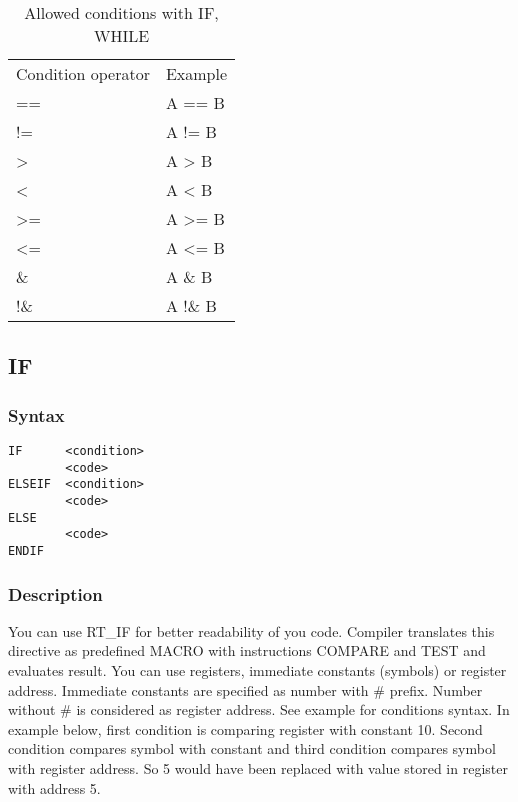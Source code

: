     \begin{table}[h!]
        \mysmallfont{}
        \centering{}
        \begin{tabular}{|l|l}
            \hline
            Condition operator       &          Example  \\
            ==                       &          A ==  B  \\
            !=                       &          A !=  B  \\
            >                        &          A >   B  \\
            <                        &          A <   B  \\
            >=                       &          A >=  B  \\
            <=                       &          A <=  B  \\
            \&                       &          A \&  B  \\
            !\&                      &          A !\& B
        \end{tabular}
        \caption{Allowed conditions with IF, WHILE}
    \end{table}

    \subsection{IF}
        \subsubsection{Syntax}
            \verb'IF      <condition>'\\
            \verb'        <code>'\\
            \verb'ELSEIF  <condition>'\\
            \verb'        <code>'\\
            \verb'ELSE'\\
            \verb'        <code>'\\
            \verb'ENDIF'

        \subsubsection{Description}
            You can use RT\_IF for better readability of you code. Compiler translates this directive as predefined MACRO with instructions COMPARE and TEST and evaluates result. You can use registers, immediate constants (symbols) or register address. Immediate constants are specified as number with \# prefix. Number without \# is considered as register address. See example for conditions syntax. In example below, first condition is comparing register with constant 10. Second condition compares symbol with constant and third condition compares symbol with register address. So 5 would have been replaced with value stored in register with address 5.

